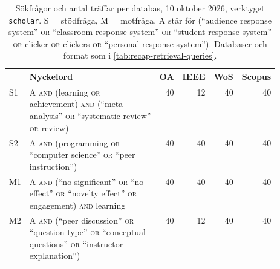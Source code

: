 \begin{table}[htbp]
  \centering
  \caption{Sökfrågor och antal träffar per databas, 10 oktober 2026,
    verktyget \texttt{scholar}.  S = stödfråga, M = motfråga.  A står
    för (\enquote{audience response system} \textsc{or}
    \enquote{classroom response system} \textsc{or} \enquote{student
    response system} \textsc{or} clicker \textsc{or} clickers
    \textsc{or} \enquote{personal response system}).  Databaser och
    format som i \cref{tab:recap-retrieval-queries}.}
  \label{tab:recap-polls-queries}
  \footnotesize
  \begin{tabular}{@{}lp{0.52\linewidth}rrrr@{}}
    \toprule
    & Nyckelord & OA & IEEE & WoS & Scopus \\
    \midrule
    S1 & A \textsc{and} (learning \textsc{or} achievement) \textsc{and}
      (\enquote{meta-analysis} \textsc{or} \enquote{systematic review}
      \textsc{or} review)
      & 40 & 12 & 40 & 40 \\
    S2 & A \textsc{and} (programming \textsc{or} \enquote{computer
      science} \textsc{or} \enquote{peer instruction})
      & 40 & 40 & 40 & 40 \\
    M1 & A \textsc{and} (\enquote{no significant} \textsc{or} \enquote{no
      effect} \textsc{or} \enquote{novelty effect} \textsc{or}
      engagement) \textsc{and} learning
      & 40 & 40 & 40 & 40 \\
    M2 & A \textsc{and} (\enquote{peer discussion} \textsc{or}
      \enquote{question type} \textsc{or} \enquote{conceptual questions}
      \textsc{or} \enquote{instructor explanation})
      & 40 & 12 & 40 & 40 \\
    \bottomrule
  \end{tabular}
\end{table}

